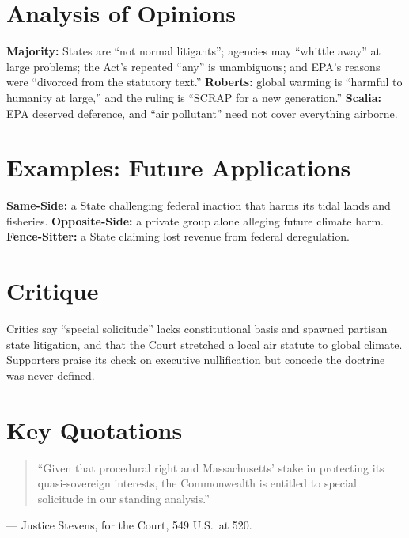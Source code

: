 \documentclass[12pt]{article}
\begin{document}
\section{Analysis of Opinions}
\textbf{Majority:} States are ``not normal litigants''; agencies may ``whittle away'' at large problems; the Act's repeated ``any'' is unambiguous; and EPA's reasons were ``divorced from the statutory text.'' \textbf{Roberts:} global warming is ``harmful to humanity at large,'' and the ruling is ``SCRAP for a new generation.'' \textbf{Scalia:} EPA deserved deference, and ``air pollutant'' need not cover everything airborne.

\section{Examples: Future Applications}
\textbf{Same-Side:} a State challenging federal inaction that harms its tidal lands and fisheries. \textbf{Opposite-Side:} a private group alone alleging future climate harm. \textbf{Fence-Sitter:} a State claiming lost revenue from federal deregulation.

\section{Critique}
Critics say ``special solicitude'' lacks constitutional basis and spawned partisan state litigation, and that the Court stretched a local air statute to global climate. Supporters praise its check on executive nullification but concede the doctrine was never defined.

\section{Key Quotations}
\begin{quote}
``Given that procedural right and Massachusetts' stake in protecting its quasi-sovereign interests, the Commonwealth is entitled to special solicitude in our standing analysis.''
\end{quote}
\noindent --- Justice Stevens, for the Court, 549 U.S.\ at 520.
\end{document}
